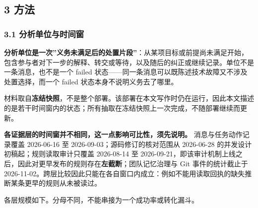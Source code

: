 \documentclass[
]{article}
\begin{document}
\subsection{3 方法}\label{ux65b9ux6cd5}

\subsubsection{3.1
分析单位与时间窗}\label{ux5206ux6790ux5355ux4f4dux4e0eux65f6ux95f4ux7a97}

\textbf{分析单位是一次''义务未满足后的处置片段''}：从某项目标或前提尚未满足开始，包含参与者对下一步的解释、转交或等待，以及随后的纠正或继续记录。单位不是一条消息，也不是一个
failed 状态------同一条消息可以既陈述技术故障又不涉及处置选择，而一个
failed 状态本身不说明义务去了哪里。

材料取自\textbf{冻结快照}，不是整个部署。该部署在本文写作时仍在运行，因此本文描述的是若干时间窗内的状态；所有抽取在冻结快照上一次完成，不随部署继续而更新。

\textbf{各证据层的时间窗并不相同，这一点影响可比性，须先说明。}
消息与任务动作记录覆盖 2026-06-16 至 2026-09-03；源码修订的核对范围从
2026-06-28 的并发设计初稿起；规则读取审计只覆盖 2026-08-14 至
2026-09-21，即该审计机制上线之后，因此对更早发布的规则存在\textbf{左截断}；团队记忆治理与
Git 事件的统计截止于
2026-11-02。跨层比较因此只能在各自窗口内成立：例如不能用读取回执的缺失推断某条更早的规则从未被读过。

各层规模如下。分母不同，不能串接为一个成功率或转化漏斗。
\end{document}
